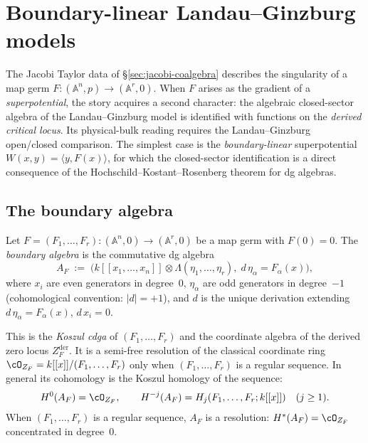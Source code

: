 \section{Boundary-linear Landau--Ginzburg models}
\label{sec:boundary-linear-lg}

The Jacobi Taylor data of \S\ref{sec:jacobi-coalgebra} describes the
singularity of a map germ $F\colon (\mathbb{A}^n, p) \to
(\mathbb{A}^r, 0)$. When $F$ arises as the gradient of a
\emph{superpotential}, the story acquires a second character: the
algebraic closed-sector algebra of the Landau--Ginzburg model is
identified with functions on the \emph{derived critical locus}. Its
physical-bulk reading requires the Landau--Ginzburg open/closed
comparison. The simplest case is the \emph{boundary-linear}
superpotential $W(x,y) = \langle y, F(x) \rangle$, for which the
closed-sector identification is a direct consequence of the
Hochschild--Kostant--Rosenberg theorem for dg algebras.

\subsection{The boundary algebra}

\begin{definition}
\label{def:boundary-algebra}
Let $F = (F_1, \ldots, F_r)\colon (\mathbb{A}^n, 0) \to (\mathbb{A}^r, 0)$ be a
map germ with $F(0) = 0$. The \emph{boundary algebra} is the
commutative dg algebra
\begin{equation}\label{eq:boundary-algebra}
A_F \;:=\; \bigl(k[[x_1, \ldots, x_n]]
\otimes \Lambda(\eta_1, \ldots, \eta_r),\;
d\,\eta_\alpha = F_\alpha(x)\bigr),
\end{equation}
where $x_i$ are even generators in degree~$0$,
$\eta_\alpha$ are odd generators in degree~$-1$
(cohomological convention: $|d| = +1$), and $d$ is the
unique derivation extending $d\,\eta_\alpha = F_\alpha(x)$,
$d\, x_i = 0$.

This is the \emph{Koszul cdga} of $(F_1, \ldots, F_r)$ and the
coordinate algebra of the derived zero locus \(Z_F^{\mathrm{der}}\).
It is a semi-free resolution of the classical coordinate ring
$\cO_{Z_F} = k[[x]] / (F_1, \ldots, F_r)$ only when
$(F_1,\ldots,F_r)$ is a regular sequence. In general its cohomology is
the Koszul homology of the sequence:
\[
H^0(A_F) = \cO_{Z_F}, \qquad
H^{-j}(A_F) = H_j(F_1,\ldots,F_r;k[[x]])
\quad (j \geq 1).
\]
When $(F_1, \ldots, F_r)$ is a regular sequence, $A_F$ is a
resolution: $H^*(A_F) = \cO_{Z_F}$ concentrated in degree~$0$.
\end{definition}

